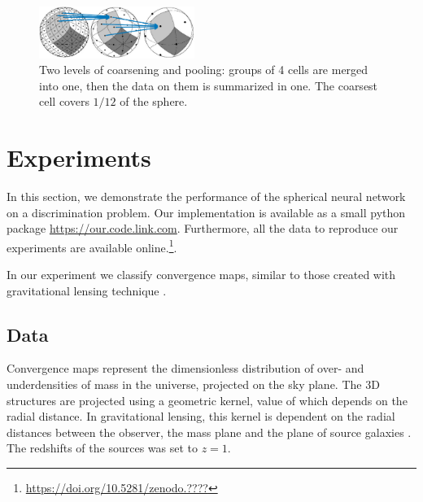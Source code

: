 \documentclass[final,twocolumn,3p,times,authoryear]{elsarticle}
\newcommand{\todo}[1]{{\color[rgb]{.6,.1,.6}{#1}}}
\newcommand{\assign}[1]{{\color[rgb]{.8,.5,.8}{Assigned: #1 }}}
\newcommand{\1}{\b{1}}              %
\newcommand{\0}{\b{0}}              %
\begin{document}
\begin{figure}[!ht]
	\centering
	\includegraphics[width=0.45\textwidth]{figures/pooling.pdf}
	\caption{Two levels of coarsening and pooling: groups of 4 cells are merged into one, then the data on them is summarized in one. The coarsest cell covers $1/12$ of the sphere.}
	\label{fig:pooling}
\end{figure}


\section{Experiments}
\label{sec:experiments}
\assign{Nathanaël, Tomek}

In this section, we demonstrate the performance of the spherical neural network on a discrimination problem.
Our implementation is available as a small python package \url{https://our.code.link.com}.
Furthermore, all the data to reproduce our experiments are available online.\footnote{\url{https://doi.org/10.5281/zenodo.????} \todo{correct DOI}}.

In our experiment we classify convergence maps, similar to those created with gravitational lensing technique \citep{chang2017curvedsky}.

\subsection{Data}
\label{sec:data}

Convergence maps represent the dimensionless distribution of over- and underdensities of mass in the universe, projected on the sky plane.
The 3D structures are projected using a geometric kernel, value of which depends on the radial distance.
In gravitational lensing, this kernel is dependent on the radial distances between the observer, the mass plane and the plane of source galaxies \citep[see][for review of gravitational lensing]{bartelman2010gravitationallensing}.
The redshifts of the sources was set to $z=1$.
\end{document}
